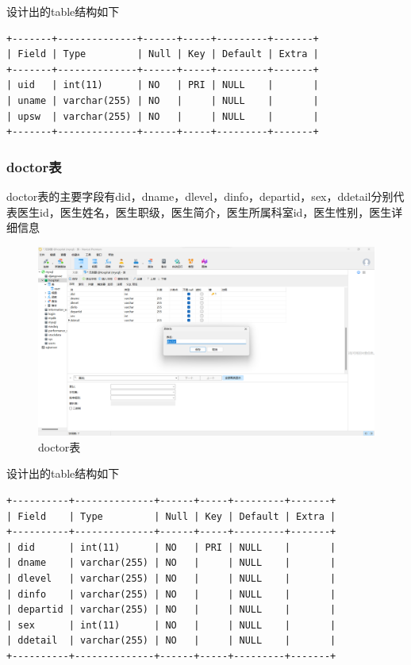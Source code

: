 \documentclass[UTF8,12pt]{article}
\begin{document}
设计出的table结构如下

\begin{lstlisting}[frame=shadowbox]
+-------+--------------+------+-----+---------+-------+
| Field | Type         | Null | Key | Default | Extra |
+-------+--------------+------+-----+---------+-------+
| uid   | int(11)      | NO   | PRI | NULL    |       |
| uname | varchar(255) | NO   |     | NULL    |       |
| upsw  | varchar(255) | NO   |     | NULL    |       |
+-------+--------------+------+-----+---------+-------+
\end{lstlisting}

\newpage

\subsubsection{doctor表}

doctor表的主要字段有did，dname，dlevel，dinfo，departid，sex，ddetail分别代表医生id，医生姓名，医生职级，医生简介，医生所属科室id，医生性别，医生详细信息

\begin{figure}[htbp]
    \centering
    \includegraphics[width=1.0\textwidth]{imgs/6.png}
    \caption{doctor表}
\end{figure}

设计出的table结构如下

\begin{lstlisting}[frame=shadowbox]
+----------+--------------+------+-----+---------+-------+
| Field    | Type         | Null | Key | Default | Extra |
+----------+--------------+------+-----+---------+-------+
| did      | int(11)      | NO   | PRI | NULL    |       |
| dname    | varchar(255) | NO   |     | NULL    |       |
| dlevel   | varchar(255) | NO   |     | NULL    |       |
| dinfo    | varchar(255) | NO   |     | NULL    |       |
| departid | varchar(255) | NO   |     | NULL    |       |
| sex      | int(11)      | NO   |     | NULL    |       |
| ddetail  | varchar(255) | NO   |     | NULL    |       |
+----------+--------------+------+-----+---------+-------+
\end{lstlisting}
\end{document}
